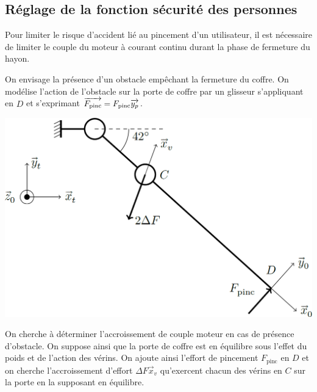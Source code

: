 \documentclass[10pt,fleqn]{article} %
\begin{document}
\begin{multicols}{2}
\begin{multicols}{2}
\subsection*{Réglage de la fonction sécurité des personnes}

\ifprof
\else
Pour limiter le risque d’accident lié au pincement d’un utilisateur, il est nécessaire de limiter le couple du moteur
à courant continu durant la phase de fermeture du hayon. %



On envisage la présence d’un obstacle empêchant la fermeture du coffre. On modélise l’action de l’obstacle sur la porte de coffre par un glisseur s’appliquant en $D$ et s’exprimant $\overrightarrow{F_{\text{pinc}}} = F_{\text{pinc}}\overrightarrow{y_p}$.

\begin{center}
\includegraphics[width=.8\linewidth]{images/fig_05}
\end{center}



%

On cherche à déterminer l’accroissement de couple moteur en cas de présence d’obstacle. On suppose ainsi que la
porte de coffre est en équilibre sous l’effet du poids et de l’action des vérins. On ajoute ainsi l’effort de pincement
$ F_{\text{pinc}}$ en $D$ et on cherche l’accroissement d’effort $\Delta F\vec{x}_v$ qu’exercent chacun des vérins en $C$ sur la porte en la supposant en équilibre.


\end{multicols}
\end{multicols}
\end{document}
